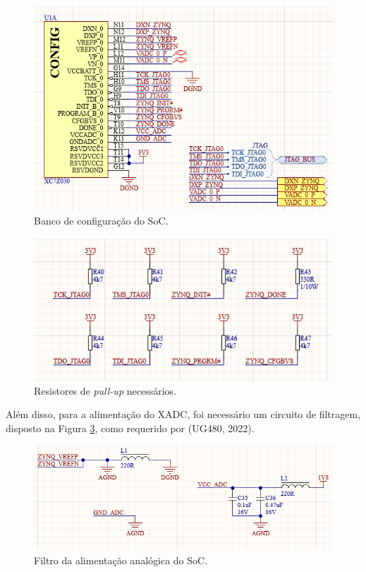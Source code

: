 \begin{figure}[H]
    \centering
    \includegraphics[scale=0.8]{images/zynqconfig.png}
    \caption{Banco de configuração do SoC.}
    \label{fig:config}
\end{figure}

\begin{figure}[H]
    \centering
    \includegraphics[scale=0.8]{images/pullupconfig.png}
    \caption{Resistores de \textit{pull-up} necessários.}
    \label{fig:pullupconfig}
\end{figure}

Além disso, para a alimentação do XADC, foi necessário um circuito de filtragem, disposto na Figura \ref{fig:xadcfilter}, como requerido por (UG480, 2022).

\begin{figure}[H]
    \centering
    \includegraphics[scale=0.8]{images/xadcfilter.png}
    \caption{Filtro da alimentação analógica do SoC.}
    \label{fig:xadcfilter}
\end{figure}


